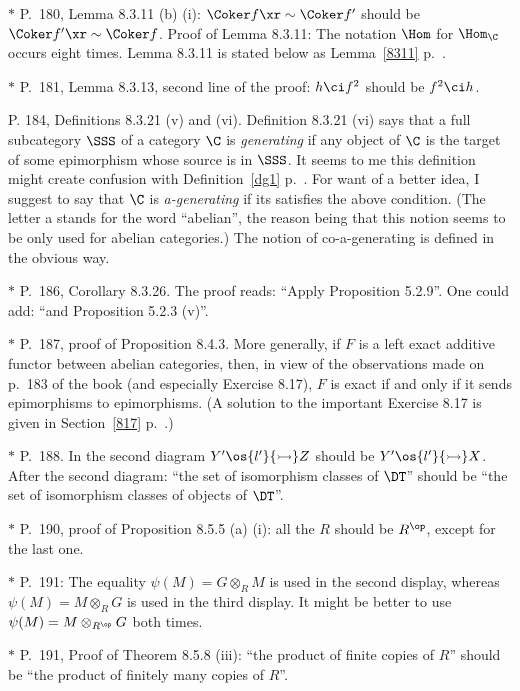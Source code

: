 \documentclass[12pt]{article}
\theoremstyle{remark}
\theoremstyle{definition}
\begin{document}
\nn$*$ P.~180, Lemma 8.3.11 (b) (i): $\Coker f\xr\sim\Coker f'$ should be $\Coker f'\xr\sim\Coker f$. Proof of Lemma 8.3.11: The notation $\Hom$ for $\Hom_\C$ occurs eight times. Lemma 8.3.11 is stated below as Lemma~\ref{8311} p.~. 

\nn$*$ P.~181, Lemma 8.3.13, second line of the proof: $h\ci f^2$ should be $f^2\ci h$. 

\begin{s} 
P. 184, Definitions 8.3.21 (v) and (vi). Definition 8.3.21 (vi) says that a full subcategory $\SSS$ of a category $\C$ is \emph{generating} if any object of $\C$ is the target of some epimorphism whose source is in $\SSS$. It seems to me this definition might create confusion with Definition~\ref{dg1} p.~. For want of a better idea, I suggest to say that $\C$ is \emph{a-generating} if its satisfies the above condition. (The letter a stands for the word ``abelian'', the reason being that this notion seems to be only used for abelian categories.) The notion of co-a-generating is defined in the obvious way.
\end{s} 

\nn$*$ P.~186, Corollary 8.3.26. The proof reads: ``Apply Proposition 5.2.9''. One could add: ``and Proposition 5.2.3 (v)''.

\nn$*$ P.~187, proof of Proposition 8.4.3. More generally, if $F$ is a left exact additive functor between abelian categories, then, in view of the observations made on p.~183 of the book (and especially Exercise 8.17), $F$ is exact if and only if it sends epimorphisms to epimorphisms. (A solution to the important Exercise 8.17 is given in Section~\ref{817} p.~.)

\nn$*$ P.~188. In the second diagram $Y'\os{l'}{\rightarrowtail}Z$ should be $Y'\os{l'}{\rightarrowtail}X$. After the second diagram: ``the set of isomorphism classes of $\DT$'' should be ``the set of isomorphism classes of objects of $\DT$''.

\nn$*$ P.~190, proof of Proposition 8.5.5 (a) (i): all the $R$ should be $R^{\op}$, except for the last one.

\nn$*$ P.~191: The equality $\psi(M)=G\otimes_RM$ is used in the second display, whereas $\psi(M)=M\otimes_RG$ is used in the third display. It might be better to use $\psi(M)=M\otimes_{R^{\op}}G$ both times. 

\nn$*$ P.~191, Proof of Theorem 8.5.8 (iii): ``the product of finite copies of $R$'' should be ``the product of finitely many copies of $R$''.
\end{document}
